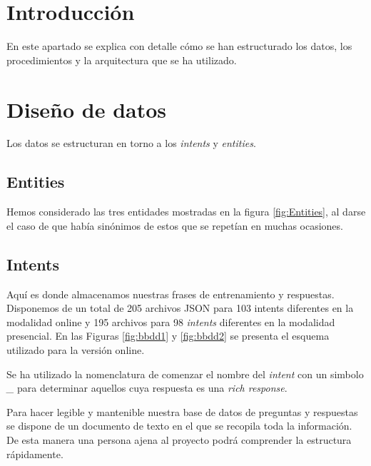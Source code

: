 
\section{Introducción}

En este apartado se explica con detalle cómo se han estructurado los datos, los procedimientos y la arquitectura que se ha utilizado.

\section{Diseño de datos}

Los datos se estructuran en torno a los \textit{intents} y \textit{entities}.

\subsection{Entities}

Hemos considerado las tres entidades mostradas en la figura \ref{fig:Entities}, al darse el caso de que había sinónimos de estos que se repetían en muchas ocasiones.


\subsection{Intents}

Aquí es donde almacenamos nuestras frases de entrenamiento y respuestas. Disponemos de un total de 205 archivos JSON para 103 intents diferentes en la modalidad online y 195 archivos para 98 \textit{intents} diferentes en la modalidad presencial. En las Figuras \ref{fig:bbdd1} y \ref{fig:bbdd2} se presenta el esquema utilizado para la versión online.



Se ha utilizado la nomenclatura de comenzar el nombre del \textit{intent} con un simbolo \textit{\_} para determinar aquellos cuya respuesta es una \textit{rich response}.

\newpage
Para hacer legible y mantenible nuestra base de datos de preguntas y respuestas se dispone de un documento de texto en el que se recopila toda la información. De esta manera una persona ajena al proyecto podrá comprender la estructura rápidamente.

